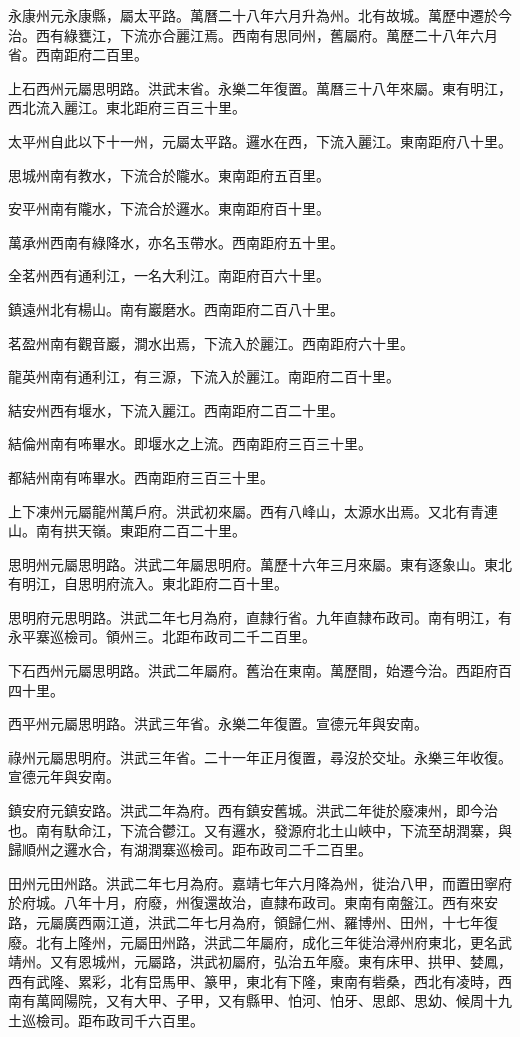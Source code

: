 永康州元永康縣，屬太平路。萬曆二十八年六月升為州。北有故城。萬歷中遷於今治。西有綠甕江，下流亦合麗江焉。西南有思同州，舊屬府。萬歷二十八年六月省。西南距府二百里。

上石西州元屬思明路。洪武末省。永樂二年復置。萬曆三十八年來屬。東有明江，西北流入麗江。東北距府三百三十里。

太平州自此以下十一州，元屬太平路。邏水在西，下流入麗江。東南距府八十里。

思城州南有教水，下流合於隴水。東南距府五百里。

安平州南有隴水，下流合於邏水。東南距府百十里。

萬承州西南有綠降水，亦名玉帶水。西南距府五十里。

全茗州西有通利江，一名大利江。南距府百六十里。

鎮遠州北有楊山。南有巖磨水。西南距府二百八十里。

茗盈州南有觀音巖，澗水出焉，下流入於麗江。西南距府六十里。

龍英州南有通利江，有三源，下流入於麗江。南距府二百十里。

結安州西有堰水，下流入麗江。西南距府二百二十里。

結倫州南有咘畢水。即堰水之上流。西南距府三百三十里。

都結州南有咘畢水。西南距府三百三十里。

上下凍州元屬龍州萬戶府。洪武初來屬。西有八峰山，太源水出焉。又北有青連山。南有拱天嶺。東距府二百二十里。

思明州元屬思明路。洪武二年屬思明府。萬歷十六年三月來屬。東有逐象山。東北有明江，自思明府流入。東北距府二百十里。

思明府元思明路。洪武二年七月為府，直隸行省。九年直隸布政司。南有明江，有永平寨巡檢司。領州三。北距布政司二千二百里。

下石西州元屬思明路。洪武二年屬府。舊治在東南。萬歷間，始遷今治。西距府百四十里。

西平州元屬思明路。洪武三年省。永樂二年復置。宣德元年與安南。

祿州元屬思明府。洪武三年省。二十一年正月復置，尋沒於交址。永樂三年收復。宣德元年與安南。

鎮安府元鎮安路。洪武二年為府。西有鎮安舊城。洪武二年徙於廢凍州，即今治也。南有馱命江，下流合鬱江。又有邏水，發源府北土山峽中，下流至胡潤寨，與歸順州之邏水合，有湖潤寨巡檢司。距布政司二千二百里。

田州元田州路。洪武二年七月為府。嘉靖七年六月降為州，徙治八甲，而置田寧府於府城。八年十月，府廢，州復還故治，直隸布政司。東南有南盤江。西有來安路，元屬廣西兩江道，洪武二年七月為府，領歸仁州、羅博州、田州，十七年復廢。北有上隆州，元屬田州路，洪武二年屬府，成化三年徙治潯州府東北，更名武靖州。又有恩城州，元屬路，洪武初屬府，弘治五年廢。東有床甲、拱甲、婪鳳，西有武隆、累彩，北有岊馬甲、篆甲，東北有下隆，東南有砦桑，西北有凌時，西南有萬岡陽院，又有大甲、子甲，又有縣甲、怕河、怕牙、思郎、思幼、候周十九土巡檢司。距布政司千六百里。

